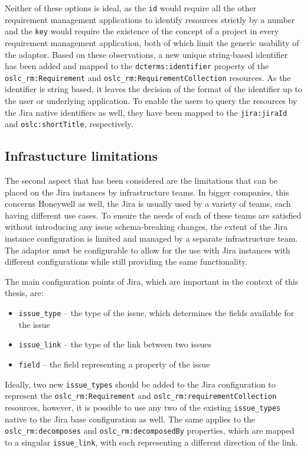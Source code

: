 Neither of these options is ideal, as the \texttt{id} would require all the other requirement management applications to identify resources strictly by a number and the \texttt{key} would require the existence of the concept of a project in every requirement management application, both of which limit the generic usability of the adaptor. Based on these observations, a new unique string-based identifier has been added and mapped to the \texttt{dcterms:identifier} property of the \texttt{oslc\_rm:Requirement} and \texttt{oslc\_rm:RequirementCollection} resources. As the identifier is string based, it leaves the decision of the format of the identifier up to the user or underlying application. To enable the users to query the resources by the Jira native identifiers as well, they have been mapped to the \texttt{jira:jiraId} and \texttt{oslc:shortTitle}, respectively.

\subsection*{Infrastucture limitations}
\label{sec:infrastructure_limitations}
The second aspect that has been considered are the limitations that can be placed on the Jira instances by infrastructure teams. In bigger companies, this concerns Honeywell as well, the Jira is usually used by a variety of teams, each having different use cases. To ensure the needs of each of these teams are satisfied without introducing any issue schema-breaking changes, the extent of the Jira instance configuration is limited and managed by a separate infrastructure team. The adaptor must be configurable to allow for the use with Jira instances with different configurations while still providing the same functionality.

The main configuration points of Jira, which are important in the context of this thesis, are:

\begin{itemize}
  \item \texttt{issue\_type} -- the type of the issue, which determines the fields available for the issue
  \item \texttt{issue\_link} -- the type of the link between two issues
  \item \texttt{field} -- the field representing a property of the issue
\end{itemize}

Ideally, two new \texttt{issue\_types} should be added to the Jira configuration to represent the \texttt{oslc\_rm:Requirement} and \texttt{oslc\_rm:requirementCollection} resources, however, it is possible to use any two of the existing \texttt{issue\_types} native to the Jira base configuration as well. The same applies to the \texttt{oslc\_rm:decomposes} and \texttt{oslc\_rm:decomposedBy} properties, which are mapped to a singular \texttt{issue\_link}, with each representing a different direction of the link.

